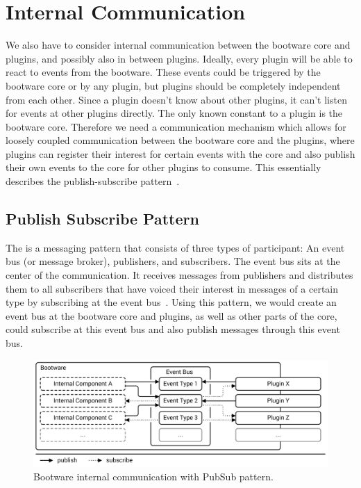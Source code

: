\section{Internal Communication}
\label{design:internalcomm}

We also have to consider internal communication between the bootware core and plugins, and possibly also in between plugins.
Ideally, every plugin will be able to react to events from the bootware.
These events could be triggered by the bootware core or by any plugin, but plugins should be completely independent from each other.
Since a plugin doesn't know about other plugins, it can't listen for events at other plugins directly.
The only known constant to a plugin is the bootware core.
Therefore we need a communication mechanism which allows for loosely coupled communication between the bootware core and the plugins, where plugins can register their interest for certain events with the core and also publish their own events to the core for other plugins to consume.
This essentially describes the publish-subscribe pattern~\autocite{pubsub}.

\subsection{Publish Subscribe Pattern}

The  is a messaging pattern that consists of three types of participant: An event bus (or message broker), publishers, and subscribers.
The event bus sits at the center of the communication.
It receives messages from publishers and distributes them to all subscribers that have voiced their interest in messages of a certain type by subscribing at the event bus~\autocite{pubsub}.
Using this pattern, we would create an event bus at the bootware core and plugins, as well as other parts of the core, could subscribe at this event bus and also publish messages through this event bus.

\begin{figure}[!htbp]
	\centering
	\includegraphics[resolution=600]{design/assets/pubsub}
	\caption{Bootware internal communication with PubSub pattern.}
	\label{image:pubsub}
\end{figure}

